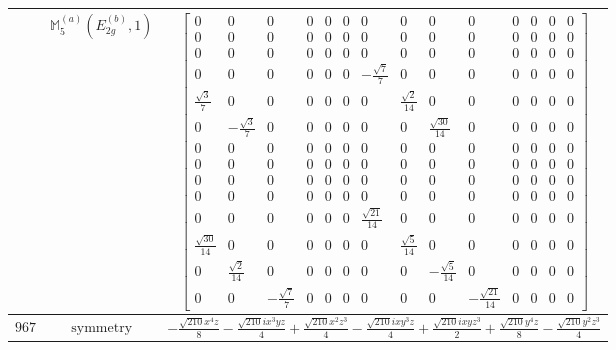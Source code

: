 \documentclass[fleqn,8pt,landscape]{jsarticle}
\begin{document}
\begin{longtable}{ccc}
$  $ & $ \mathbb{M}_{5}^{(a)}(E_{2g}^{(b)},1) $ & $ \begin{bmatrix} 0 & 0 & 0 & 0 & 0 & 0 & 0 & 0 & 0 & 0 & 0 & 0 & 0 & 0 \\ 0 & 0 & 0 & 0 & 0 & 0 & 0 & 0 & 0 & 0 & 0 & 0 & 0 & 0 \\ 0 & 0 & 0 & 0 & 0 & 0 & 0 & 0 & 0 & 0 & 0 & 0 & 0 & 0 \\ 0 & 0 & 0 & 0 & 0 & 0 & - \frac{\sqrt{7}}{7} & 0 & 0 & 0 & 0 & 0 & 0 & 0 \\ \frac{\sqrt{3}}{7} & 0 & 0 & 0 & 0 & 0 & 0 & \frac{\sqrt{2}}{14} & 0 & 0 & 0 & 0 & 0 & 0 \\ 0 & - \frac{\sqrt{3}}{7} & 0 & 0 & 0 & 0 & 0 & 0 & \frac{\sqrt{30}}{14} & 0 & 0 & 0 & 0 & 0 \\ 0 & 0 & 0 & 0 & 0 & 0 & 0 & 0 & 0 & 0 & 0 & 0 & 0 & 0 \\ 0 & 0 & 0 & 0 & 0 & 0 & 0 & 0 & 0 & 0 & 0 & 0 & 0 & 0 \\ 0 & 0 & 0 & 0 & 0 & 0 & 0 & 0 & 0 & 0 & 0 & 0 & 0 & 0 \\ 0 & 0 & 0 & 0 & 0 & 0 & 0 & 0 & 0 & 0 & 0 & 0 & 0 & 0 \\ 0 & 0 & 0 & 0 & 0 & 0 & \frac{\sqrt{21}}{14} & 0 & 0 & 0 & 0 & 0 & 0 & 0 \\ \frac{\sqrt{30}}{14} & 0 & 0 & 0 & 0 & 0 & 0 & \frac{\sqrt{5}}{14} & 0 & 0 & 0 & 0 & 0 & 0 \\ 0 & \frac{\sqrt{2}}{14} & 0 & 0 & 0 & 0 & 0 & 0 & - \frac{\sqrt{5}}{14} & 0 & 0 & 0 & 0 & 0 \\ 0 & 0 & - \frac{\sqrt{7}}{7} & 0 & 0 & 0 & 0 & 0 & 0 & - \frac{\sqrt{21}}{14} & 0 & 0 & 0 & 0 \end{bmatrix} $ \\ \hline
$ 967 $ & $ \text{symmetry} $ & $ - \frac{\sqrt{210} x^{4} z}{8} - \frac{\sqrt{210} i x^{3} y z}{4} + \frac{\sqrt{210} x^{2} z^{3}}{4} - \frac{\sqrt{210} i x y^{3} z}{4} + \frac{\sqrt{210} i x y z^{3}}{2} + \frac{\sqrt{210} y^{4} z}{8} - \frac{\sqrt{210} y^{2} z^{3}}{4} $ \\

\end{longtable}
\end{document}
